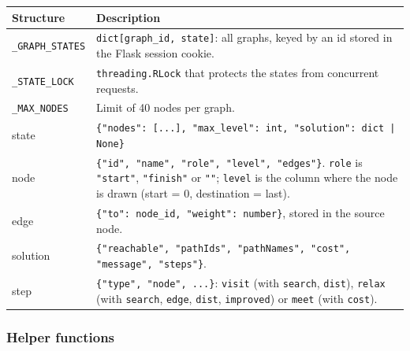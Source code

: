 \documentclass[11pt,letterpaper]{article}
\newcommand{\code}[1]{\texttt{#1}}
\begin{document}
\begin{tabularx}{\textwidth}{>{\raggedright\arraybackslash}p{3.2cm}L}
\toprule
\textbf{Structure} & \textbf{Description} \\
\midrule
\code{\_GRAPH\_STATES} & \code{dict[graph\_id, state]}: all graphs, keyed by an id stored in the Flask session cookie. \\
\code{\_STATE\_LOCK} & \code{threading.RLock} that protects the states from concurrent requests. \\
\code{\_MAX\_NODES} & Limit of 40 nodes per graph. \\
state & \code{\{"nodes": [...], "max\_level": int, "solution": dict | None\}} \\
node & \code{\{"id", "name", "role", "level", "edges"\}}. \code{role} is \code{"start"}, \code{"finish"} or \code{""}; \code{level} is the column where the node is drawn (start = 0, destination = last). \\
edge & \code{\{"to": node\_id, "weight": number\}}, stored in the source node. \\
solution & \code{\{"reachable", "pathIds", "pathNames", "cost", "message", "steps"\}}. \\
step & \code{\{"type", "node", ...\}}: \code{visit} (with \code{search}, \code{dist}), \code{relax} (with \code{search}, \code{edge}, \code{dist}, \code{improved}) or \code{meet} (with \code{cost}). \\
\bottomrule
\end{tabularx}

\subsubsection*{Helper functions}
\end{document}
